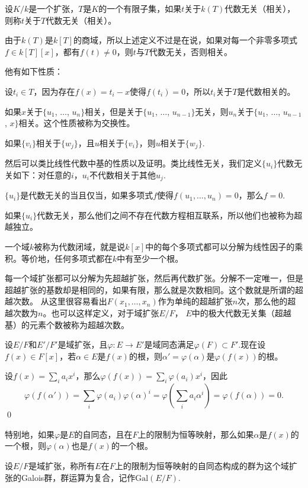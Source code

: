 \begin{para}
设$K/k$是一个扩张，$T$是$K$的一个有限子集，如果$t$关于$k(T)$代数无关（相关），则称$t$关于$T$代数无关（相关）。
\end{para}

由于$k(T)$是$k[T]$的商域，所以上述定义不过是在说，如果对每一个非零多项式$f\in k[T][x]$，都有$f(t)\neq 0$，则$t$与$T$代数无关，否则相关。

他有如下性质：

 设$t_i\in T$，因为存在$f(x)=t_i-x$使得$f(t_i)=0$，所以$t_i$关于$T$是代数相关的。

 如果$x$关于$\{u_1$, $\dots$, $u_n\}$相关，但是关于$\{u_1$, $\dots$, $u_{n-1}\}$无关，则$u_n$关于$\{u_1$, $\dots$, $u_{n-1}$, $x\}$相关。这个性质被称为交换性。

 如果$\{v_i\}$相关于$\{w_j\}$，且$u$相关于$\{v_i\}$，则$u$相关于$\{w_j\}$.

然后可以类比线性代数中基的性质以及证明。类比线性无关，我们定义$\{u_i\}$代数无关如下：对任意的$i$，$u_i$不代数相关于其他$u_j$.

\pro $\{u_i\}$是代数无关的当且仅当，如果多项式$f$使得$f(u_1,\dots ,u_n)=0$，那么$f=0$.

如果$\{u_i\}$代数无关，那么他们之间不存在代数方程相互联系，所以他们也被称为超越独立。

\para 一个域$k$被称为代数闭域，就是说$k[x]$中的每个多项式都可以分解为线性因子的乘积。等价地，任何多项式都在$k$中有至少一个根。

每一个域扩张都可以分解为先超越扩张，然后再代数扩张。分解不一定唯一，但是超越扩张的基数却是相同的，如果有限，那么就是次数相同。这个数就是所谓的超越次数。 从这里很容易看出$F(x_1,\dots ,x_n)$作为单纯的超越扩张$n$次，那么他的超越次数为$n$。也可以这样定义，对于域扩张$E/F$， $E$中的极大代数无关集（超越基）的元素个数被称为超越次数。

\lem 设$E/F$和$E'/F'$是域扩张，且$\varphi:E\to E'$是域同态满足$\varphi(F)\subset F'$.现在设$f(x)\in F[x]$，若$\alpha\in E$是$f(x)$的根，则$\alpha'=\varphi(\alpha)$是$\varphi(f(x))$的根。

\proof 设$f(x)=\sum_i a_i x^i$，那么$\varphi(f(x))=\sum_i \varphi(a_i) x^i$，因此
\[
	\varphi(f(\alpha'))=\sum_i \varphi(a_i) \varphi(\alpha)^i=\varphi\left(\sum_i a_i\alpha^i\right)=\varphi\left(f(\alpha)\right)=0.
\]\qed

特别地，如果$\varphi$是$E$的自同态，且在$F$上的限制为恒等映射，那么如果$\alpha$是$f(x)$的一个根，则$\varphi(\alpha)$也是$f(x)$的一个根。

\para 设$E/F$是域扩张，称所有$E$在$F$上的限制为恒等映射的自同态构成的群为这个域扩张的Galois群，群运算为复合，记作$\mathrm{Gal}(E/F)$.

